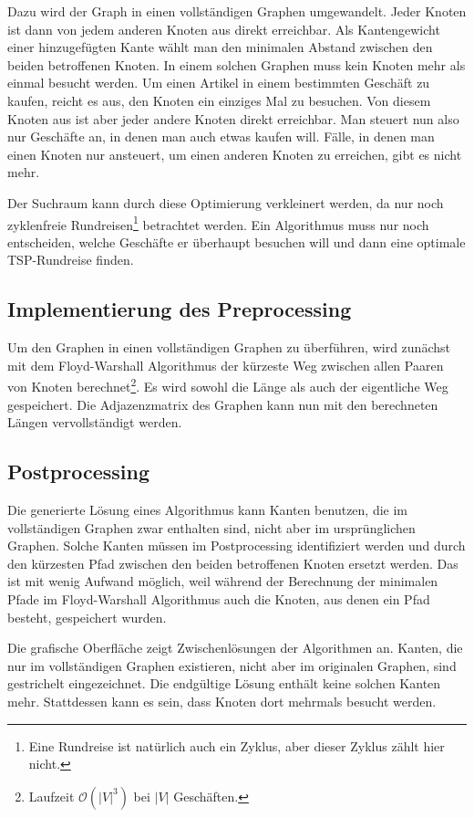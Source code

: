 Dazu wird der Graph in einen vollständigen Graphen umgewandelt. Jeder Knoten ist dann von jedem anderen Knoten aus direkt erreichbar. Als Kantengewicht einer hinzugefügten Kante wählt man den minimalen Abstand zwischen den beiden betroffenen Knoten. In einem solchen Graphen muss kein Knoten mehr als einmal besucht werden. Um einen Artikel in einem bestimmten Geschäft zu kaufen, reicht es aus, den Knoten ein einziges Mal zu besuchen. Von diesem Knoten aus ist aber jeder andere Knoten direkt erreichbar. Man steuert nun also nur Geschäfte an, in denen man auch etwas kaufen will. Fälle, in denen man einen Knoten nur ansteuert, um einen anderen Knoten zu erreichen, gibt es nicht mehr.

Der Suchraum kann durch diese Optimierung verkleinert werden, da nur noch zyklenfreie Rundreisen\footnote{Eine Rundreise ist natürlich auch ein Zyklus, aber dieser Zyklus zählt hier nicht.} betrachtet werden. Ein Algorithmus muss nur noch entscheiden, welche Geschäfte er überhaupt besuchen will und dann eine optimale TSP-Rundreise finden.

\subsection{Implementierung des Preprocessing}
Um den Graphen in einen vollständigen Graphen zu überführen, wird zunächst mit dem Floyd-Warshall Algorithmus der kürzeste Weg zwischen allen Paaren von Knoten berechnet\footnote{Laufzeit $\mathcal{O}(|V|^3)$ bei $|V|$ Geschäften.}. Es wird sowohl die Länge als auch der eigentliche Weg gespeichert. Die Adjazenzmatrix des Graphen kann nun mit den berechneten Längen vervollständigt werden.

\subsection{Postprocessing}
Die generierte Lösung eines Algorithmus kann Kanten benutzen, die im vollständigen Graphen zwar enthalten sind, nicht aber im ursprünglichen Graphen. Solche Kanten müssen im Postprocessing identifiziert werden und durch den kürzesten Pfad zwischen den beiden betroffenen Knoten ersetzt werden. Das ist mit wenig Aufwand möglich, weil während der Berechnung der minimalen Pfade im Floyd-Warshall Algorithmus auch die Knoten, aus denen ein Pfad besteht, gespeichert wurden.

Die grafische Oberfläche zeigt Zwischenlösungen der Algorithmen an. Kanten, die nur im vollständigen Graphen existieren, nicht aber im originalen Graphen, sind gestrichelt eingezeichnet. Die endgültige Lösung enthält keine solchen Kanten mehr. Stattdessen kann es sein, dass Knoten dort mehrmals besucht werden.
